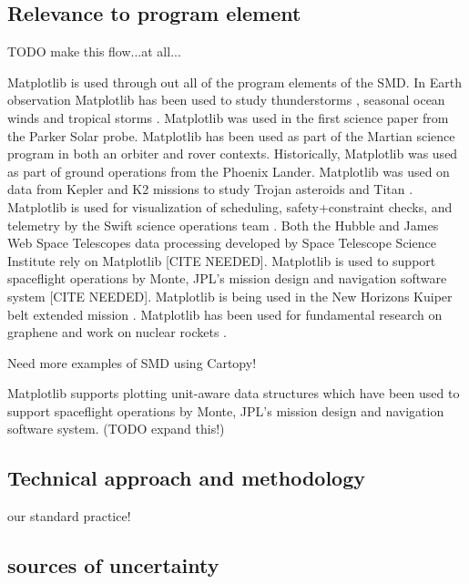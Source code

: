 \documentclass[12pt]{article}
\numberwithin{page}{section}
\begin{document}
\subsection{Relevance to program element}

TODO make this flow...at all...

Matplotlib is used through out all of the program elements of the SMD.
In Earth observation Matplotlib has been used to study thunderstorms
\cite{https://doi.org/10.1002/2016JD025299,https://doi.org/10.1029/2019JD030874},
seasonal ocean winds \cite{https://doi.org/10.1002/2017JD027516} and
tropical storms \cite{Lang_2020}.  Matplotlib was used in the first
science paper from the Parker Solar probe\cite{Bale2019}.  Matplotlib
has been used as part of the Martian science program in both an
orbiter \cite{https://doi.org/10.1029/2019JE006188} and
rover\cite{https://doi.org/10.1002/2016EA000219} contexts.
Historically, Matplotlib was used as part of ground operations from
the Phoenix Lander.  Matplotlib was used on data from Kepler and K2
missions to study Trojan asteroids\cite{Nixon_2019} and Titan
\cite{Ryan_2017,2019PASP..131h4505P}.
Matplotlib is used for visualization of scheduling, safety+constraint checks, and telemetry by the Swift science operations team \cite{swift_ops,2020ApJ...900...35T}.
Both the Hubble and James Web Space Telescopes data processing
developed by Space Telescope Science Institute rely on Matplotlib [CITE NEEDED].
Matplotlib is used to support spaceflight operations by Monte, JPL's
mission design and navigation software system [CITE NEEDED].
Matplotlib is being used in the New Horizons Kuiper belt extended mission \cite{Porter_2018}.  Matplotlib
has been used for fundamental research on graphene \cite{PhysRevLett.120.236802} and
work on nuclear rockets \cite{leu_cerment}.

Need more examples of SMD using Cartopy!

Matplotlib supports plotting unit-aware data structures which have
been used to support spaceflight operations by Monte, JPL's mission
design and navigation software system. (TODO expand this!)

\subsection{Technical approach and methodology}

our standard practice!

\subsection{sources of uncertainty}
\end{document}
